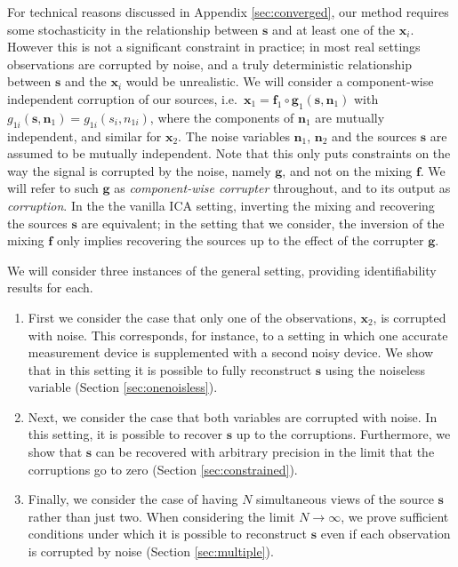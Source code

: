 For technical reasons discussed in Appendix
\ref{sec:converged}, our method requires some stochasticity in the relationship between $\bm{s}$ and at least one of the $\bm{x}_i$.
However this is not a significant constraint in practice; in most real settings observations are corrupted by noise, and a truly deterministic relationship between $\bm{s}$ and the $\bm{x}_i$ would be unrealistic.
We will consider a component-wise independent corruption of our sources, i.e.~$\bm{x}_1 = \bm{f}_1 \circ \bm{g}_1(\bm{s}, \bm{n}_1)$ with $g_{1i}(\bm{s}, \bm{n}_1) = g_{1i}(s_i, n_{1i})$, where the components of $\bm{n}_{1}$ are mutually independent, and similar for $\bm{x}_2$. The noise variables $\bm{n}_1$, $\bm{n}_2$ and the sources $\bm{s}$ are assumed to be mutually independent.
Note that this only puts constraints on the way the signal is corrupted by the noise, namely $\bm{g}$, and not on the mixing $\bm{f}$.
We will refer to such $\bm{g}$ as \emph{component-wise corrupter} throughout, and to its output as \emph{corruption}.
In the the vanilla ICA setting, inverting the mixing and recovering the sources $\bm{s}$ are equivalent; in the setting that we consider, the inversion of the mixing $\bm{f}$ only implies recovering the sources up to the effect of the corrupter $\bm{g}$.

We will consider three instances of the general setting, providing identifiability results for each.
\begin{enumerate}
    \item First we consider the case that only one of the observations, $\bm{x}_2$, is corrupted with noise. This corresponds, for instance, to a setting in which one accurate measurement device is supplemented with a second noisy device. We show that in this setting it is possible to fully reconstruct $\bm{s}$ using the noiseless variable (Section \ref{sec:onenoisless}).
    \item Next, we consider the case that both variables are corrupted with noise. In this setting, it is possible to recover $\bm{s}$ up to the corruptions.     Furthermore, we show that $\bm{s}$ can be recovered with arbitrary precision in the limit that the corruptions go to zero (Section \ref{sec:constrained}).
    \item Finally, we consider the case of having $N$ simultaneous views of the source $\bm{s}$ rather than just two.
    When considering the limit $N \rightarrow \infty$, we prove sufficient conditions under which it is possible to reconstruct $\bm{s}$ even if each observation is corrupted by noise (Section \ref{sec:multiple}).
\end{enumerate}

